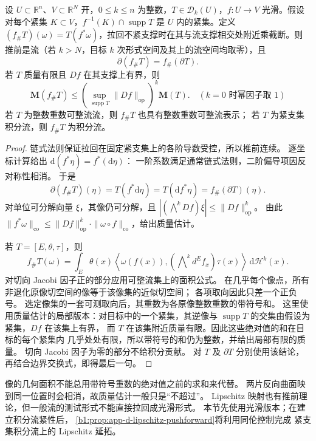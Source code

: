 \begin{proposition}\label{b1:prop:app-d-pushforward}
设 \(U\subset\mathbb R^n\)、\(V\subset\mathbb R^N\) 开，\(0\le k\le n\) 为整数，\(T\in\mathcal D_k(U)\)，\(f:U\to V\) 光滑。假设对每个紧集 \(K\subset V\)，\(f^{-1}(K)\cap\operatorname{supp}T\) 是 \(U\) 内的紧集。定义 \((f_\#T)(\omega)=T(f^*\omega)\)，拉回不紧支撑时在其与流支撑相交处附近乘截断。则推前是流（若 \(k>N\)，目标 \(k\) 次形式空间及其上的流空间均取零），且
\[
 \partial(f_\#T)=f_\#(\partial T).
\]
若 \(T\) 质量有限且 \(Df\) 在其支撑上有界，则
\[
 \mathbf M(f_\#T)\leq
   \left(\sup_{\operatorname{supp}T}\|Df\|_{\mathrm{op}}\right)^k
          \mathbf M(T).
\quad(k=0\text{ 时幂因子取 }1)
\]
若 \(T\) 为整数重数可整流流，则 \(f_\#T\) 也具有整数重数可整流表示；
若 \(T\) 为紧支集积分流，则 \(f_\#T\) 为积分流。
\end{proposition}
\begin{proof}
链式法则保证拉回在固定紧支集上的各阶导数受控，所以推前连续。
逐坐标计算给出 \(\mathrm{d}(f^*\eta)=f^*(\mathrm{d}\eta)\)：
一阶系数满足通常链式法则，二阶偏导项因反对称性相消。
于是
\[
 \partial(f_\#T)(\eta)=T(f^*\mathrm{d}\eta)
       =T(\mathrm{d} f^*\eta)=f_\#(\partial T)(\eta).
\]
对单位可分解向量 \(\xi\)，其像仍可分解，且
\(|(\bigwedge^kDf)\xi|\leq\|Df\|_{\mathrm{op}}^k\)。
由此
\(\|f^*\omega\|_{\mathrm{co}}\leq
\|Df\|_{\mathrm{op}}^k\cdot\|\omega\circ f\|_{\mathrm{co}}\)，给出质量估计。

若 \(T=[E,\theta,\tau]\)，则
\[
 f_\#T(\omega)
   =\int_E\theta(x)
       \left\langle\omega(f(x)),(\bigwedge\nolimits^kd^Ef_x)\tau(x)\right\rangle
          \,\mathrm{d}\mathcal H^k(x).
\]
对切向 Jacobi 因子正的部分应用可整流集上的面积公式。
在几乎每个像点，所有非退化原像切空间的像等于该像集的近似切空间；
各项取向因此只差一个正负号。
选定像集的一套可测取向后，其重数为各原像整数重数的带符号和。
这里使用质量估计的局部版本：对目标中的一个紧集，其逆像与
\(\operatorname{supp}T\) 的交集由假设为紧集，\(Df\) 在该集上有界，
而 \(T\) 在该集附近质量有限。因此这些绝对值的和在目标的每个紧集内
几乎处处有限，所以带符号的和仍为整数，并给出局部有限的质量。
切向 Jacobi 因子为零的部分不给积分贡献。
对 \(T\) 及 \(\partial T\) 分别使用该结论，再结合边界交换式，即得最后一句。
\end{proof}

像的几何面积不能总用带符号重数的绝对值之前的求和来代替。
两片反向曲面映到同一位置时会相消，故质量估计一般只是“不超过”。
Lipschitz 映射也有推前理论，但一般流的测试形式不能直接拉回成光滑形式。
本节先使用光滑版本；在建立积分流紧性后，%
\cref{b1:prop:app-d-lipschitz-pushforward}将利用同伦控制完成
紧支集积分流上的 Lipschitz 延拓。

